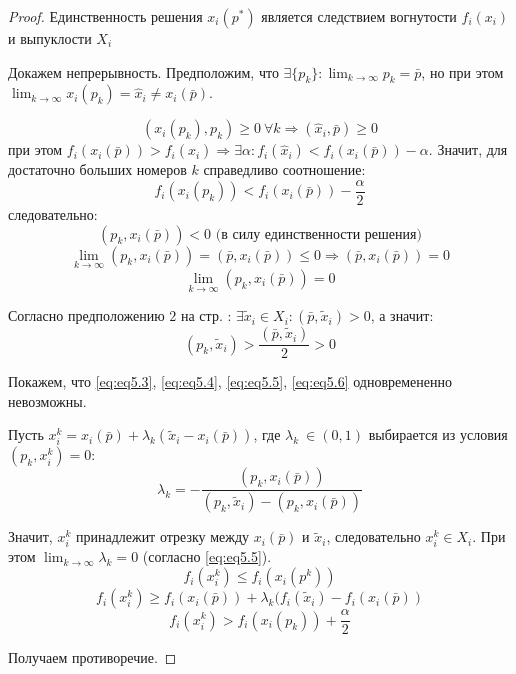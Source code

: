 \documentclass[12pt,a4paper,titlepage,oneside]{book}
\theoremstyle{definition}
\theoremstyle{plain}
\theoremstyle{remark}
\theoremstyle{remark}
\theoremstyle{plain}
\theoremstyle{plain}
\begin{document}
\begin{proof}
Единственность решения $x_i(p^*)$ является следствием вогнутости $f_i(x_i)$ и выпуклости $X_i$

Докажем непрерывность. Предположим, что $\displaystyle \exists\{p_k\}:\lim_{k \to \infty} p_k= \bar{p}$, но при этом $\displaystyle \lim_{k \to \infty} x_i(p_k) = \hat{x}_i \neq x_i(\bar{p})$.

$$(x_i(p_k),p_k) \geqslant 0~\forall k \Longrightarrow (\hat{x}_i,\bar{p}) \geqslant 0$$ 
при этом $f_i(x_i(\bar{p})) > f_i(\hat{x}_i) \Longrightarrow \exists \alpha: f_i(\hat{x}_i) <f_i(x_i(\bar{p})) - \alpha$. Значит, для достаточно больших номеров $k$ справедливо соотношение: 
\begin{equation} \label{eq:eq5.3}
f_i(x_i(p_k)) <f_i(x_i(\bar{p})) - \frac{\alpha}{2}
\end{equation}
следовательно:
\begin{equation} \label{eq:eq5.4}
(p_k,x_i(\bar{p}))<0 \text{ (в силу единственности решения)}
\end{equation}
$$\lim_{k \to \infty} (p_k,x_i(\bar{p})) = (\bar{p},x_i(\bar{p})) \leqslant 0 \Longrightarrow (\bar{p},x_i(\bar{p})) = 0$$
\begin{equation} \label{eq:eq5.5}
\lim_{k \to \infty}(p_k,x_i(\bar{p}))=0
\end{equation}

Согласно предположению $2$ на стр. \pageref{en:en1}: $\exists \tilde{x}_i \in X_i: (\bar{p},\tilde{x}_i) >0$, а значит:
\begin{equation} \label{eq:eq5.6}
(p_k,\tilde{x}_i)>\frac{(\bar{p},\tilde{x}_i)}{2} >0
\end{equation}

Покажем, что \eqref{eq:eq5.3}, \eqref{eq:eq5.4}, \eqref{eq:eq5.5}, \eqref{eq:eq5.6} одновремененно невозможны.

Пусть $x_i^k = x_i(\bar{p}) + \lambda_k (\tilde{x}_i - x_i(\bar{p}))$, где $\lambda_k \ \in (0,1)$ выбирается из условия $(p_k,x_i^k) = 0$:
$$\lambda_k = - \frac{(p_k,x_i(\bar{p}))}{(p_k,\tilde{x}_i) - (p_k,x_i(\bar{p}))}$$

Значит, $x_i^k$ принадлежит отрезку между $x_i(\bar{p})$ и $\tilde{x}_i$, следовательно $x_i^k \in X_i$.
При этом $\displaystyle \lim_{k \to \infty} \lambda_k = 0$ (согласно \eqref{eq:eq5.5}).
$$f_i(x_i^k) \leqslant f_i(x_i(p^k))$$
$$f_i(x_i^k) \geqslant f_i(x_i(\bar{p})) + \lambda_k (f_i(\tilde{x}_i) - f_i(x_i(\bar{p}))$$
$$f_i(x_i^k)> f_i(x_i(p_k)) + \frac{\alpha}{2}$$

Получаем противоречие.
\end{proof}
\end{document}
